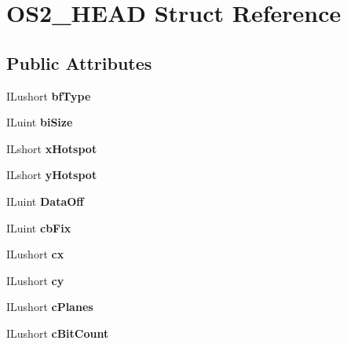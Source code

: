 \hypertarget{structOS2__HEAD}{}\section{O\+S2\+\_\+\+H\+E\+AD Struct Reference}
\label{structOS2__HEAD}
\subsection*{Public Attributes}
\begin{DoxyCompactItemize}
\item 
\mbox{\label{structOS2__HEAD_ae0b77ae9b8ebd0fab456e026ffed4baf}} 
I\+Lushort {\bfseries bf\+Type}
\item 
\mbox{\label{structOS2__HEAD_a86fc8d64a103d5530402a5b980e58582}} 
I\+Luint {\bfseries bi\+Size}
\item 
\mbox{\label{structOS2__HEAD_a158739ea8e29c465fcb31b70f94d7b9e}} 
I\+Lshort {\bfseries x\+Hotspot}
\item 
\mbox{\label{structOS2__HEAD_a11769dfba06f1f9a40fd89b5e9b28d04}} 
I\+Lshort {\bfseries y\+Hotspot}
\item 
\mbox{\label{structOS2__HEAD_a673772316382c3515ebfb3b70dd6a1a6}} 
I\+Luint {\bfseries Data\+Off}
\item 
\mbox{\label{structOS2__HEAD_af1db3fba586c647547c6ebdf857489cc}} 
I\+Luint {\bfseries cb\+Fix}
\item 
\mbox{\label{structOS2__HEAD_a6463314ec7388c23710e56cdb3062c5f}} 
I\+Lushort {\bfseries cx}
\item 
\mbox{\label{structOS2__HEAD_af89ae7b9b72263375d2c062003a8a1b5}} 
I\+Lushort {\bfseries cy}
\item 
\mbox{\label{structOS2__HEAD_a9bf940bb67c625ee50af17355b71919d}} 
I\+Lushort {\bfseries c\+Planes}
\item 
\mbox{\label{structOS2__HEAD_ac9cfbe25ad14d62ff5e8d66feb193edb}} 
I\+Lushort {\bfseries c\+Bit\+Count}
\end{DoxyCompactItemize}


